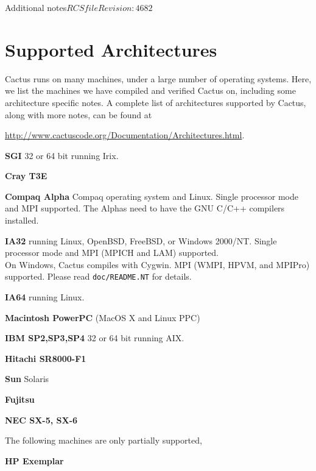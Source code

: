 \begin{cactuspart}{Additional notes}{$RCSfile$}{$Revision: 4682 $}
\section{Supported Architectures}
\label{sec:suar}

Cactus runs on many machines, under a large number of operating
systems.  Here, we list the machines we have compiled and verified
Cactus on, including some architecture specific notes.  A complete
list of architectures supported by Cactus, along with more notes, can
be found at
\begin{center}
\url{http://www.cactuscode.org/Documentation/Architectures.html}.
\end{center}

\begin{Lentry}
\item[\textbf{SGI}] 32 or 64 bit running Irix.
\item[\textbf{Cray T3E}]
\item[\textbf{Compaq Alpha}]  Compaq operating system and Linux.
  Single processor
  mode and MPI supported. The Alphas need to have the GNU C/C++
  compilers installed.
\item[\textbf{IA32}] running Linux, OpenBSD, FreeBSD, or Windows 2000/NT.
  Single processor mode and MPI (MPICH and LAM) supported.\\
  On Windows, Cactus compiles with Cygwin.  MPI (WMPI, HPVM, and MPIPro)
  supported.  Please read \texttt{doc/README.NT} for details.
\item[\textbf{IA64}]  running Linux.
\item[\textbf{Macintosh PowerPC}] (MacOS X and Linux PPC)
\item[\textbf{IBM SP2,SP3,SP4}] 32 or 64 bit running AIX.
\item[\textbf{Hitachi SR8000-F1}]
\item[\textbf{Sun} Solaris]
\item[\textbf{Fujitsu}]
\item[\textbf{NEC SX-5, SX-6}]
\end{Lentry}

The following machines are only partially supported,
\begin{Lentry}
\item[\textbf{HP Exemplar}]
\end{Lentry}


\end{cactuspart}
